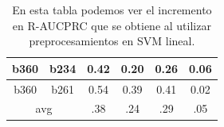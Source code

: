 \begin{table}[h!]
\begin{tabular}{|c|c|c|c|c|c|}
b360                & b234               & 0.42        & 0.20           & 0.26                   & 0.06                       \\ \hline
b360                & b261               & 0.54        & 0.39           & 0.41                   & 0.02                       \\ \hline
\multicolumn{2}{|c|}{avg}                & .38         & .24            & .29                    & {\color[HTML]{009901} .05} \\ \hline
\end{tabular}
\caption{ En esta tabla podemos ver el incremento en R-AUCPRC que se obtiene al utilizar preprocesamientos en SVM lineal. }
\label{tab:linear-gain-preproc}
\end{table}

